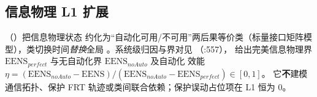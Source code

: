 \subsection{信息物理 L1 扩展}
（）把信息物理状态
约化为“自动化可用/不可用”两后果等价类（标量接口矩阵模型），类切换时间\emph{替换}全局
。系统级归因与界对见 （:557），
给出完美信息物理界 $\mathrm{EENS}_{perfect}$ 与无自动化界 $\mathrm{EENS}_{noAuto}$ 及自动化
效能 $\eta=(\mathrm{EENS}_{noAuto}-\mathrm{EENS})/(\mathrm{EENS}_{noAuto}-\mathrm{EENS}_{perfect})\in[0,1]$。
它\textbf{不}建模通信拓扑、保护 FRT 轨迹或类间联合依赖；保护误动占位项在 L1 恒为 0。
